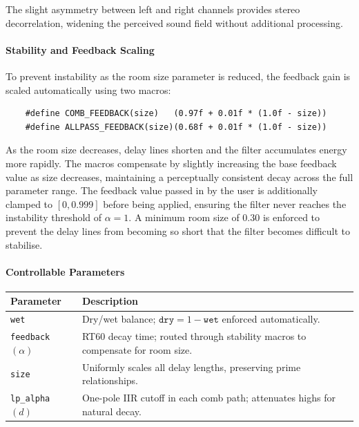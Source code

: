 The slight asymmetry between left and right channels provides stereo decorrelation, widening the perceived sound field without additional processing.

\paragraph{Stability and Feedback Scaling} To prevent instability as the room size parameter is reduced, the feedback gain is scaled automatically using two macros:

\begin{verbatim}
	#define COMB_FEEDBACK(size)   (0.97f + 0.01f * (1.0f - size))
	#define ALLPASS_FEEDBACK(size)(0.68f + 0.01f * (1.0f - size))
\end{verbatim}

As the room size decreases, delay lines shorten and the filter accumulates energy more rapidly. 
The macros compensate by slightly increasing the base feedback value as size decreases, maintaining a perceptually consistent decay across the full parameter range. 
The feedback value passed in by the user is additionally clamped to $[0,0.999]$ before being applied, ensuring the filter never reaches the instability threshold of $\alpha = 1$. 
A minimum room size of 0.30 is enforced to prevent the delay lines from becoming so short that the filter becomes difficult to stabilise.

\paragraph{Controllable Parameters}
\begin{center}
    \small
    \begin{tabular}{ll}
        \toprule
        \textbf{Parameter} & \textbf{Description} \\
        \midrule
        \texttt{wet}            & Dry/wet balance; $\texttt{dry} = 1 - \texttt{wet}$ enforced automatically. \\
        \texttt{feedback} $(\alpha)$ & RT60 decay time; routed through stability macros to compensate for room size. \\
        \texttt{size}           & Uniformly scales all delay lengths, preserving prime relationships. \\
        \texttt{lp\_alpha} $(d)$  & One-pole IIR cutoff in each comb path; attenuates highs for natural decay. \\
        \bottomrule
    \end{tabular}
\end{center}

